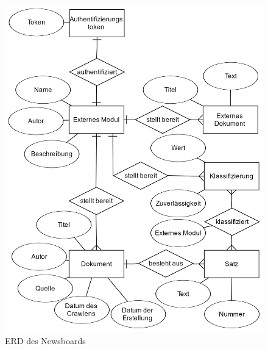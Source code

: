 \begin{figure}[h]
	\centering 
	\includegraphics[scale=0.175]{content/erd.png}
	\caption{ERD des Newsboards}
	\label{erd}
\end{figure}

